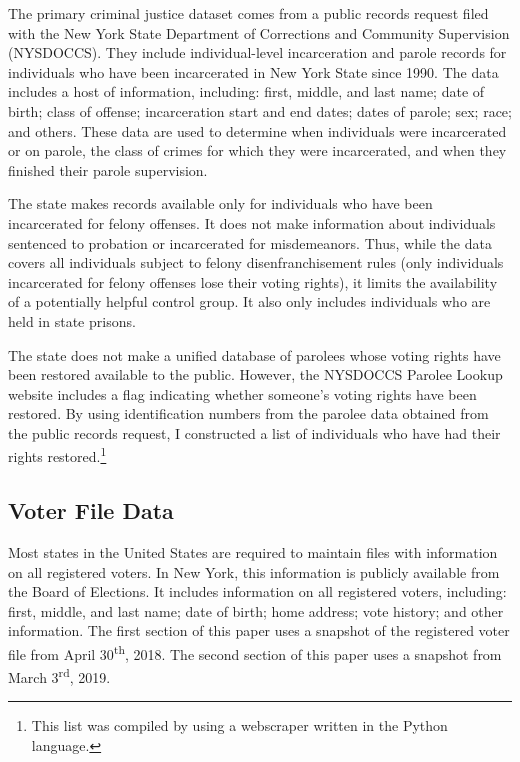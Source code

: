 \documentclass[]{article}
\let\rmarkdownfootnote\footnote%
\def\footnote{\protect\rmarkdownfootnote}
\begin{document}
The primary criminal justice dataset comes from a public records request filed with the New York State Department of Corrections and Community Supervision (NYSDOCCS). They include individual-level incarceration and parole records for individuals who have been incarcerated in New York State since 1990. The data includes a host of information, including: first, middle, and last name; date of birth; class of offense; incarceration start and end dates; dates of parole; sex; race; and others. These data are used to determine when individuals were incarcerated or on parole, the class of crimes for which they were incarcerated, and when they finished their parole supervision.

The state makes records available only for individuals who have been incarcerated for felony offenses. It does not make information about individuals sentenced to probation or incarcerated for misdemeanors. Thus, while the data covers all individuals subject to felony disenfranchisement rules (only individuals incarcerated for felony offenses lose their voting rights), it limits the availability of a potentially helpful control group. It also only includes individuals who are held in state prisons.

The state does not make a unified database of parolees whose voting rights have been restored available to the public. However, the NYSDOCCS Parolee Lookup website includes a flag indicating whether someone's voting rights have been restored. By using identification numbers from the parolee data obtained from the public records request, I constructed a list of individuals who have had their rights restored.\footnote{This list was compiled by using a webscraper written in the Python language.}

\hypertarget{voter-file-data}{%
\subsection*{Voter File Data}\label{voter-file-data}}

Most states in the United States are required to maintain files with information on all registered voters. In New York, this information is publicly available from the Board of Elections. It includes information on all registered voters, including: first, middle, and last name; date of birth; home address; vote history; and other information. The first section of this paper uses a snapshot of the registered voter file from April 30\textsuperscript{th}, 2018. The second section of this paper uses a snapshot from March 3\textsuperscript{rd}, 2019.
\end{document}
